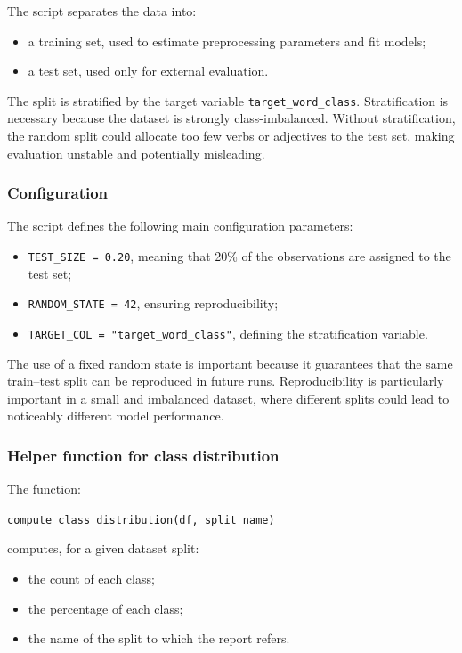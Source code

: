 \documentclass{ipgpmaster}
\begin{document}
The script separates the data into:

\begin{itemize}
    \item a training set, used to estimate preprocessing parameters and fit models;
    \item a test set, used only for external evaluation.
\end{itemize}

The split is stratified by the target variable \texttt{target\_word\_class}. Stratification is necessary because the dataset is strongly class-imbalanced. Without stratification, the random split could allocate too few verbs or adjectives to the test set, making evaluation unstable and potentially misleading.

\subsubsection{Configuration}

The script defines the following main configuration parameters:

\begin{itemize}
    \item \texttt{TEST\_SIZE = 0.20}, meaning that 20\% of the observations are assigned to the test set;
    \item \texttt{RANDOM\_STATE = 42}, ensuring reproducibility;
    \item \texttt{TARGET\_COL = "target\_word\_class"}, defining the stratification variable.
\end{itemize}

The use of a fixed random state is important because it guarantees that the same train--test split can be reproduced in future runs. Reproducibility is particularly important in a small and imbalanced dataset, where different splits could lead to noticeably different model performance.

\subsubsection{Helper function for class distribution}

The function:

\begin{center}
\texttt{compute\_class\_distribution(df, split\_name)}
\end{center}

computes, for a given dataset split:

\begin{itemize}
    \item the count of each class;
    \item the percentage of each class;
    \item the name of the split to which the report refers.
\end{itemize}
\end{document}
